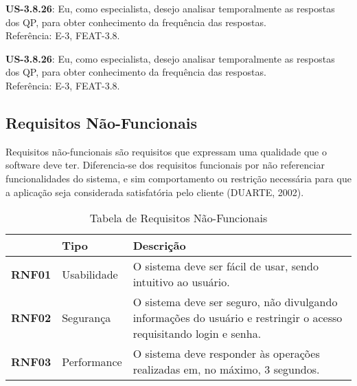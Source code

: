 \begin{itemize}
{\begin{itemize}
{					\item \textbf{US-3.8.26}: Eu, como especialista, desejo analisar temporalmente as respostas dos QP, para obter conhecimento da frequência das respostas.\\
					Referência: E-3, FEAT-3.8.

					\item \textbf{US-3.8.26}: Eu, como especialista, desejo analisar temporalmente as respostas dos QP, para obter conhecimento da frequência das respostas.\\
					Referência: E-3, FEAT-3.8.
				}
				\end{itemize}
			}
			\end{itemize}


	\subsection{Requisitos Não-Funcionais}

		Requisitos não-funcionais são requisitos que expressam uma qualidade que o software deve ter. Diferencia-se dos requisitos funcionais por não referenciar funcionalidades do sistema, e sim comportamento ou restrição necessária para que a aplicação seja considerada satisfatória pelo cliente (DUARTE, 2002).

		\vspace*{0.5cm}

		\begin{table}[htbp]
			\caption{Tabela de Requisitos Não-Funcionais}
			\begin{tabular}{|l|l|p{11cm}|}
				\hline
				 & \textbf{Tipo} & \textbf{Descrição} \\ \hline
				\textbf{RNF01} & Usabilidade  & O sistema deve ser fácil de usar, sendo intuitivo ao usuário. \\ \hline

				\textbf{RNF02} & Segurança & O sistema deve ser seguro, não divulgando informações do usuário e restringir o acesso requisitando login e senha. \\ \hline

				\textbf{RNF03} & Performance & O sistema deve responder às operações realizadas em, no máximo, 3 segundos. \\ \hline
			\end{tabular}
		\label{Tabela de Requisitos Não-Funcionais}
		\end{table}